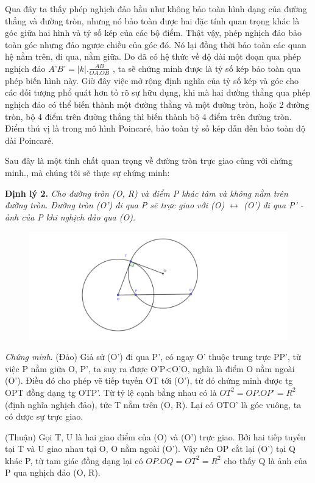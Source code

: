 Qua đây ta thấy phép nghịch đảo hầu như không bảo toàn hình dạng của đường thẳng và đường tròn, nhưng nó bảo toàn được hai đặc tính quan trọng khác là góc giữa hai hình và tỷ số kép của các bộ điểm. Thật vậy, phép nghịch đảo bảo toàn góc nhưng đảo ngược chiều của góc đó. Nó lại đồng thời bảo toàn các quan hệ nằm trên, đi qua, nằm giữa. Do đã có hệ thức về độ dài một đoạn qua phép nghịch đảo  $A’B’ = |k|. \frac{AB}{OA.OB}$ , ta sẽ chứng minh được là tỷ số kép bảo toàn qua phép biến hình này. Giờ đây việc mở rộng định nghĩa của tỷ số kép và góc cho các đối tượng phổ quát hơn tỏ rõ sự hữu dụng, khi mà hai đường thẳng qua phép nghịch đảo có thể biến thành một đường thẳng và một đường tròn, hoặc 2 đường tròn, bộ 4 điểm trên đường thẳng thì biến thành bộ 4 điểm trên đường tròn. Điểm thú vị là trong mô hình Poincar\'e, bảo toàn tỷ số kép dẫn đến bảo toàn độ dài Poincar\'e.

Sau đây là một tính chất quan trọng về đường tròn trực giao cùng với chứng minh., mà chúng tôi sẽ thực sự chứng minh:

\textbf{Định lý 2.} \textit{ Cho đường tròn (O, R) và điểm P khác tâm và không nằm trên đường tròn. Đường tròn (O’) đi qua P sẽ trực giao với (O) $ \leftrightarrow$ (O’) đi qua P’ - ảnh của P khi nghịch đảo qua (O).}

\begin{figure}[ht]
\includegraphics[width=\textwidth]{Dinh_ly_1.pdf}
\end{figure}


\textit{Chứng minh}. (Đảo) Giả sử (O’) đi qua P’, có ngay O’ thuộc trung trực PP’, từ việc P nằm giữa O, P’, ta suy ra được O’P<O’O, nghĩa là điểm O nằm ngoài (O’). Điều đó cho phép vẽ tiếp tuyến OT tới (O’), từ đó chứng minh được tg OPT đồng dạng tg OTP’. Từ tỷ lệ cạnh bằng nhau có là $OT^2 = OP.OP’ = R^2$ (định nghĩa nghịch đảo), tức T nằm trên (O, R). Lại có OTO’ là góc vuông, ta có được sự trực giao.

(Thuận) Gọi T, U là hai giao điểm của (O) và (O’) trực giao. Bởi hai tiếp tuyến tại T và U giao nhau tại O, O nằm ngoài (O’). Vậy nên OP cắt lại (O’) tại Q khác P, từ tam giác đồng dạng lại có $OP.OQ = OT^2 = R^2$ cho thấy Q là ảnh của P qua nghịch đảo (O, R).

